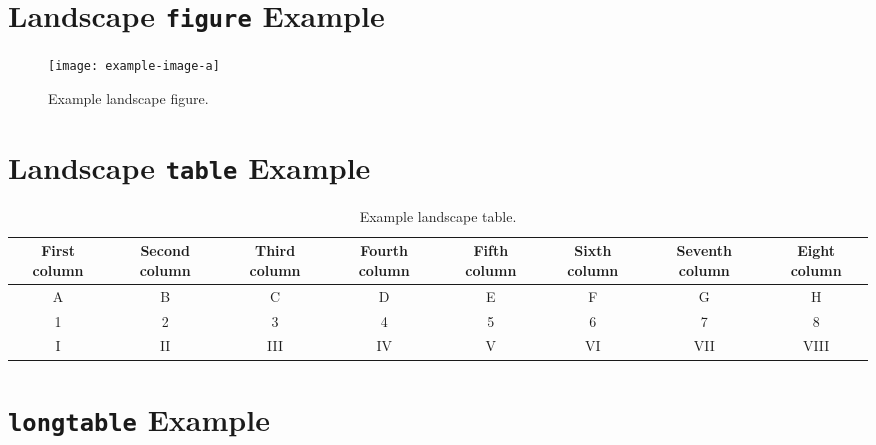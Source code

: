 \documentclass{umalayathesis}
\begin{document}
\nocite{*}
\ownreferences

\begin{appendices}
\chapter{Landscape \texttt{figure} Example}\label{app:landscapefigure}

\begin{landscape}
    \begin{figure}[h]
        \centering
        \texttt{[image: example-image-a]}
        \caption{Example landscape figure.}
        \label{fig:landscapefigure}
    \end{figure}
\end{landscape}

\chapter{Landscape \texttt{table} Example}\label{app:landscapetable}

\begin{landscape}
    \begin{table}[h]
        \centering
        \begin{tabular}{cccccccc}
            \hline
            First column & Second column & Third column & Fourth column & Fifth column & Sixth column & Seventh column & Eight column \\
            \hline
            A & B & C & D & E & F & G & H \\
            1 & 2 & 3 & 4 & 5 & 6 & 7 & 8 \\
            I & II & III & IV & V & VI & VII & VIII \\
            \hline
        \end{tabular}
        \caption{Example landscape table.}
        \label{tab:landscapetable}
    \end{table}
\end{landscape}

\chapter{\texttt{longtable} Example}\label{app:longtable}


\end{appendices}
\end{document}
